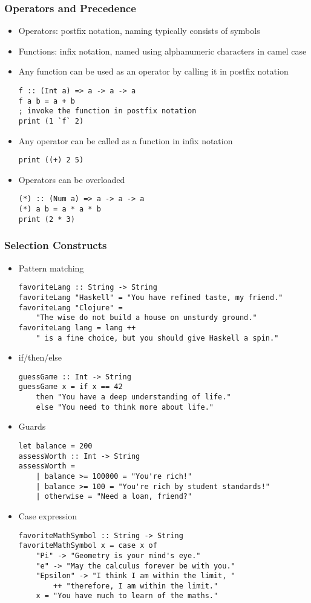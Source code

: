 \documentclass[titlepage,12pt]{article}
\newcommand{\bi}{\begin{itemize}}
\newcommand{\ei}{\end{itemize}}
\begin{document}
\subsubsection{Operators and Precedence}
\bi
    \item Operators: postfix notation, naming typically consists of symbols
    \item Functions: infix notation, named using alphanumeric characters in camel case
    \item Any function can be used as an operator by calling it in postfix notation
\begin{verbatim}
f :: (Int a) => a -> a -> a
f a b = a + b
; invoke the function in postfix notation
print (1 `f` 2)
\end{verbatim}
    \item Any operator can be called as a function in infix notation
\begin{verbatim}
print ((+) 2 5)
\end{verbatim}
    \item Operators can be overloaded
\begin{verbatim}
(*) :: (Num a) => a -> a -> a
(*) a b = a * a * b
print (2 * 3)
\end{verbatim}
\ei

\subsubsection{Selection Constructs}
\bi
    \item Pattern matching
\begin{verbatim}
favoriteLang :: String -> String
favoriteLang "Haskell" = "You have refined taste, my friend."
favoriteLang "Clojure" = 
    "The wise do not build a house on unsturdy ground."
favoriteLang lang = lang ++ 
    " is a fine choice, but you should give Haskell a spin."
\end{verbatim}
    \item if/then/else
\begin{verbatim}
guessGame :: Int -> String
guessGame x = if x == 42
    then "You have a deep understanding of life."
    else "You need to think more about life."
\end{verbatim}
    \item Guards
\begin{verbatim}
let balance = 200
assessWorth :: Int -> String
assessWorth =
    | balance >= 100000 = "You're rich!"
    | balance >= 100 = "You're rich by student standards!"
    | otherwise = "Need a loan, friend?"
\end{verbatim}
    \item Case expression
\begin{verbatim}
favoriteMathSymbol :: String -> String
favoriteMathSymbol x = case x of
    "Pi" -> "Geometry is your mind's eye."
    "e" -> "May the calculus forever be with you."
    "Epsilon" -> "I think I am within the limit, "
        ++ "therefore, I am within the limit."
    x = "You have much to learn of the maths."
\end{verbatim}
\ei
\end{document}
